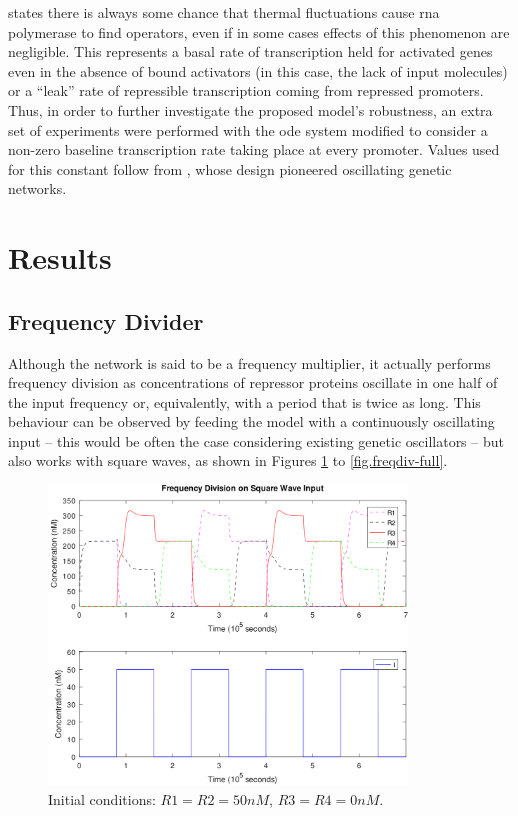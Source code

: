   \citet{ingalls} states there is always some chance that thermal fluctuations cause \acs{rna} polymerase to find operators, even if in some cases effects of this phenomenon are negligible.
  This represents a basal rate of transcription held for activated genes even in the absence of bound activators (in this case, the lack of input molecules) or a ``leak'' rate of repressible transcription coming from repressed promoters.
  Thus, in order to further investigate the proposed model's robustness, an extra set of experiments were performed with the \ac{ode} system modified to consider a non-zero baseline transcription rate taking place at every promoter.
  Values used for this constant follow from \citet{repressilator}, whose design pioneered oscillating genetic networks.


\section{Results}

  \subsection{Frequency Divider}

    Although the network is said to be a frequency multiplier, it actually performs frequency division as concentrations of repressor proteins oscillate in one half of the input frequency or, equivalently, with a period that is twice as long.
    This behaviour can be observed by feeding the model with a continuously oscillating input -- this would be often the case considering existing genetic oscillators -- but also works with square waves, as shown in Figures \ref{fig.freqdiv-square} to \ref{fig.freqdiv-full}.

    \begin{figure}[!htbp]
      \centering
      \includegraphics[width=0.85\textwidth]{img/freqdiv-square-1.png}
      \caption{Initial conditions: $R1 = R2 = 50nM$, $R3 = R4 = 0nM$.}
      \label{fig.freqdiv-square}
    \end{figure}

